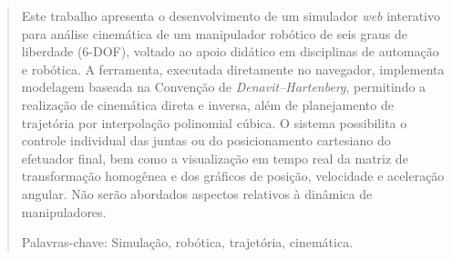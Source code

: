 \begin{abstract}

Este trabalho apresenta o desenvolvimento de um simulador \textit{web} interativo para análise cinemática de um manipulador robótico de seis graus de liberdade (6-DOF), voltado ao apoio didático em disciplinas de automação e robótica. A ferramenta, executada diretamente no navegador, implementa modelagem baseada na Convenção de \textit{Denavit–Hartenberg}, permitindo a realização de cinemática direta e inversa, além de planejamento de trajetória por interpolação polinomial cúbica. O sistema possibilita o controle individual das juntas ou do posicionamento cartesiano do efetuador final, bem como a visualização em tempo real da matriz de transformação homogênea e dos gráficos de posição, velocidade e aceleração angular. Não serão abordados aspectos relativos à dinâmica de manipuladores.

Palavras-chave: Simulação, robótica, trajetória, cinemática.

\end{abstract}

